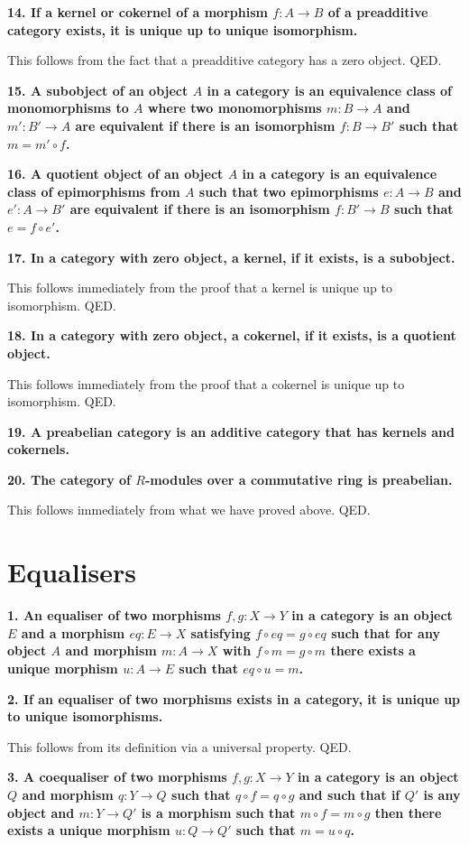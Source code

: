 \documentclass[12pt]{article}
\begin{document}
\textbf{14. If a kernel or cokernel of a morphism $f : A \to B$ of a preadditive category exists, it is unique up to unique isomorphism.}

This follows from the fact that a preadditive category has a zero object. QED.

\textbf{15. A subobject of an object $A$ in a category is an equivalence class of monomorphisms to $A$ where two monomorphisms $m : B \to A$ and $m' : B' \to A$ are equivalent if there is an isomorphism $f : B \to B'$ such that $m = m'\circ f$.}

\textbf{16. A quotient object of an object $A$ in a category is an equivalence class of epimorphisms from $A$ such that two epimorphisms $e : A \to B$ and $e' : A \to B'$ are equivalent if there is an isomorphism $f : B' \to B$ such that $e = f\circ e'$.}

\textbf{17. In a category with zero object, a kernel, if it exists, is a subobject.}

This follows immediately from the proof that a kernel is unique up to isomorphism. QED.

\textbf{18. In a category with zero object, a cokernel, if it exists, is a quotient object.}

This follows immediately from the proof that a cokernel is unique up to isomorphism. QED.

\textbf{19. A preabelian category is an additive category that has kernels and cokernels.}

\textbf{20. The category of $R$-modules over a commutative ring is preabelian.}

This follows immediately from what we have proved above. QED.

\section{Equalisers}

\textbf{1. An equaliser of two morphisms $f, g : X \to Y$ in a category is an object $E$ and a morphism $eq : E \to X$ satisfying $f\circ eq = g\circ eq$ such that for any object $A$ and morphism $m : A \to X$ with $f\circ m = g\circ m$ there exists a unique morphism $u : A \to E$ such that $eq\circ u = m$.}

\textbf{2. If an equaliser of two morphisms exists in a category, it is unique up to unique isomorphisms.}

This follows from its definition via a universal property. QED.

\textbf{3. A coequaliser of two morphisms $f, g : X \to Y$ in a category is an object $Q$ and morphism $q : Y \to Q$ such that $q\circ f = q\circ g$ and such that if $Q'$ is any object and $m : Y \to Q'$ is a morphism such that $m\circ f = m\circ g$ then there exists a unique morphism $u : Q \to Q'$ such that $m = u\circ q$.}
\end{document}
